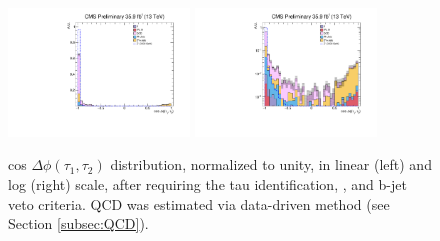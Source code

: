  
  \begin{figure}[H]
 \begin{center}
 \captionsetup[subfloat]{farskip=0pt,captionskip=0.0cm,labelformat=empty}
 \includegraphics[clip,width=0.43\textwidth]{figuras/Chapter5/TauID_Plots/EventSelection_cosDphi.pdf}
 \includegraphics[clip,width=0.43\textwidth]{figuras/Chapter5/TauID_Plots/EventSelection_cosDphi_log.pdf}
 \end{center}
 \caption{cos $\Delta \phi (\tau_{1},\tau_{2})$ distribution, normalized to unity, in linear (left) and log (right) scale, after requiring
 the tau identification, \MET, and b-jet veto criteria. QCD was estimated via data-driven method (see Section \ref{subsec:QCD}).}
 \label{cosDphi}
 \end{figure}

